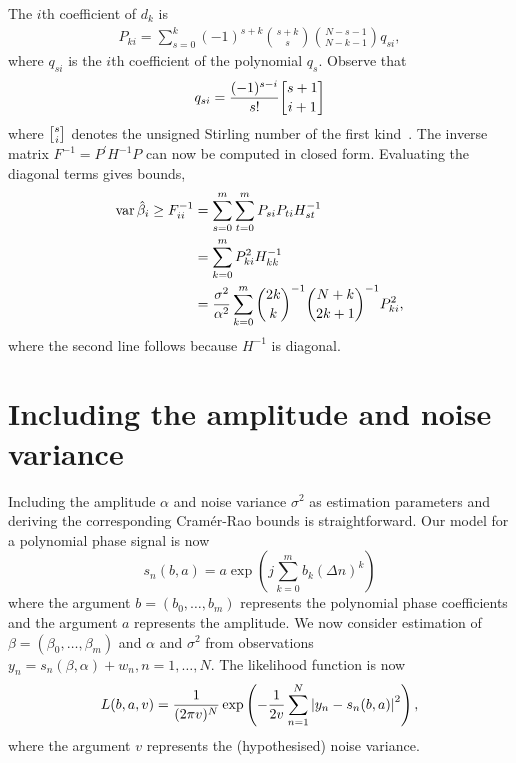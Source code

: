 \documentclass[review]{elsarticle}
\begin{document}
The $i$th coefficient of $d_k$ is
\begin{align*}
P_{ki} = \sum_{s=0}^k{(-1)^{s+k}\binom{s+k}{s}\binom{N-s-1}{N-k-1}q_{si}},
\end{align*}
where $q_{si}$ is the $i$th coefficient of the polynomial $q_s$.  Observe that
\[
q_{si} = \frac{(-1)^{s-i}}{s!}\stirling{s+1}{i+1}
\]
where $\stirling{s}{i}$ denotes the unsigned Stirling number of the first kind~\cite{Abramowitz_Stegen_stirling_numbers_1972}.   
The inverse matrix $F^{-1} = P^\prime H^{-1} P$ can now be computed in closed form.  Evaluating the diagonal terms gives bounds,
\begin{align*}
\operatorname{var} \hat{\beta}_i \geq F_{ii}^{-1} &=  \sum_{s=0}^{m}\sum_{t=0}^{m} P_{si} P_{ti}  H_{st}^{-1} \\
&=  \sum_{k=0}^{m} P_{ki}^2  H_{kk}^{-1} \\
&= \frac{\sigma^2}{\alpha^2} \sum_{k=0}^{m} \binom{2k}{k}^{-1} \binom{N+k}{2k+1}^{-1} P_{ki}^2,
\end{align*}
where the second line follows because $H^{-1}$ is diagonal.
 

\section{Including the amplitude and noise variance}\label{sec:including-amplitude}

Including the amplitude $\alpha$ and noise variance $\sigma^2$ as estimation parameters and deriving the corresponding Cram\'{e}r-Rao bounds is straightforward.  Our model for a polynomial phase signal is now
\[
s_n(b,a) = a \exp\left( j \sum_{k = 0}^{m}{b_k (\Delta n)^k}\right)
\]
where the argument $b=(b_0, \dots, b_m)$ represents the polynomial phase coefficients and the argument $a$ represents the amplitude.  We now consider estimation of $\beta = (\beta_0, \dots, \beta_m)$ and $\alpha$ and $\sigma^2$  from observations $y_n = s_n(\beta,\alpha) + w_n, n = 1,\dots,N$.  The likelihood function is now
\[
L(b,a,v) = \frac{1}{(2 \pi v )^N} \exp\left( - \frac{1}{2 v } \sum_{n=1}^N {\left| y_n -  s_n(b,a)  \right|}^2 \right),
\]
where the argument $v$ represents the (hypothesised) noise variance.
\end{document}
